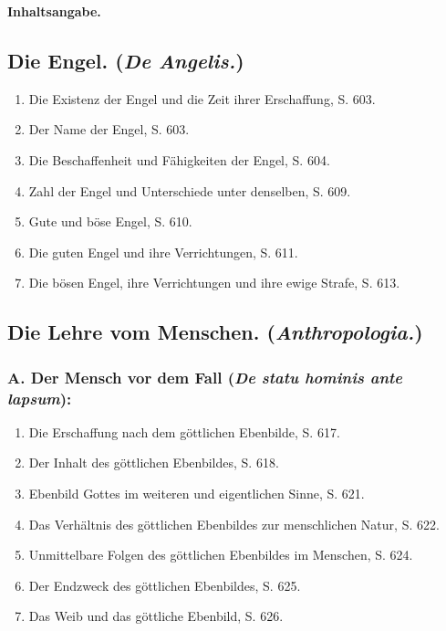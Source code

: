{}
\thispagestyle{plain}
\vspace*{\fill}
\begin{center}
\textbf{Inhaltsangabe.}
\end{center}
\vspace*{\fill}

\subsection*{\centering Die Engel. (\emph{De Angelis.})}
\begin{enumerate}
    \item Die Existenz der Engel und die Zeit ihrer Erschaffung, S. 603.
    \item Der Name der Engel, S. 603.
    \item Die Beschaffenheit und Fähigkeiten der Engel, S. 604.
    \item Zahl der Engel und Unterschiede unter denselben, S. 609.
    \item Gute und böse Engel, S. 610.
    \item Die guten Engel und ihre Verrichtungen, S. 611.
    \item Die bösen Engel, ihre Verrichtungen und ihre ewige Strafe, S. 613.
\end{enumerate}

\subsection*{\centering Die Lehre vom Menschen. (\emph{Anthropologia.})}

\subsubsection*{A. Der Mensch vor dem Fall (\emph{De statu hominis ante lapsum}):}
\begin{enumerate}
    \item Die Erschaffung nach dem göttlichen Ebenbilde, S. 617.
    \item Der Inhalt des göttlichen Ebenbildes, S. 618.
    \item Ebenbild Gottes im weiteren und eigentlichen Sinne, S. 621.
    \item Das Verhältnis des göttlichen Ebenbildes zur menschlichen Natur, S. 622.
    \item Unmittelbare Folgen des göttlichen Ebenbildes im Menschen, S. 624.
    \item Der Endzweck des göttlichen Ebenbildes, S. 625.
    \item Das Weib und das göttliche Ebenbild, S. 626.
\end{enumerate}

